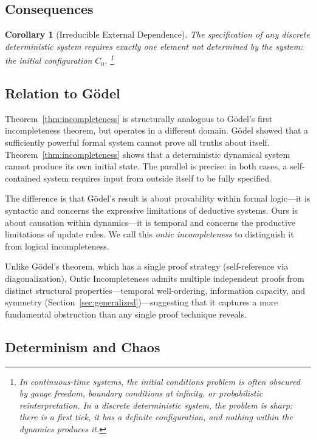 \documentclass[12pt]{article}
\theoremstyle{plain}
\newtheorem{corollary}[theorem]{Corollary}
\theoremstyle{definition}
\theoremstyle{remark}
\begin{document}
\subsection{Consequences}

\begin{corollary}[Irreducible External Dependence]\label{cor:external}
The specification of any discrete deterministic system requires exactly one element not determined by the system: the initial configuration $C_0$.%
\footnote{In continuous-time systems, the initial conditions problem is often obscured by gauge freedom, boundary conditions at infinity, or probabilistic reinterpretation. In a discrete deterministic system, the problem is sharp: there is a first tick, it has a definite configuration, and nothing within the dynamics produces it.}
\end{corollary}

\subsection{Relation to G\"odel}\label{sec:godel}

Theorem~\ref{thm:incompleteness} is structurally analogous to G\"odel's first incompleteness theorem, but operates in a different domain. G\"odel showed that a sufficiently powerful formal system cannot prove all truths about itself. Theorem~\ref{thm:incompleteness} shows that a deterministic dynamical system cannot produce its own initial state. The parallel is precise: in both cases, a self-contained system requires input from outside itself to be fully specified.

The difference is that G\"odel's result is about provability within formal logic---it is syntactic and concerns the expressive limitations of deductive systems. Ours is about causation within dynamics---it is temporal and concerns the productive limitations of update rules. We call this \emph{ontic incompleteness} to distinguish it from logical incompleteness.

Unlike G\"odel's theorem, which has a single proof strategy (self-reference via diagonalization), Ontic Incompleteness admits multiple independent proofs from distinct structural properties---temporal well-ordering, information capacity, and symmetry (Section~\ref{sec:generalized})---suggesting that it captures a more fundamental obstruction than any single proof technique reveals.

\subsection{Determinism and Chaos}
\end{document}
